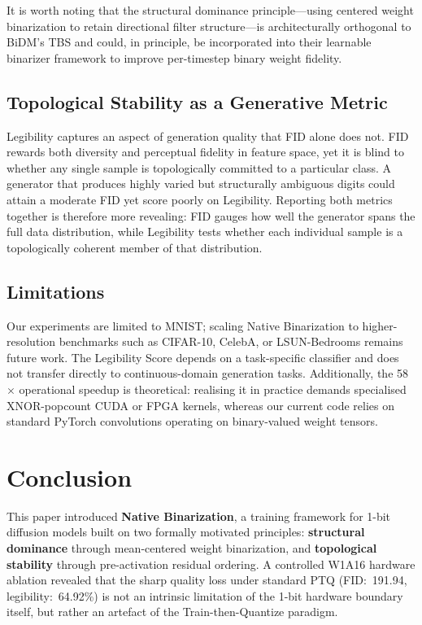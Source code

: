 \documentclass[twocolumn, journal]{IEEEtran}
\begin{document}
It is worth noting that the structural dominance principle---using centered weight
binarization to retain directional filter structure---is architecturally orthogonal to
BiDM's TBS and could, in principle, be incorporated into their learnable binarizer
framework to improve per-timestep binary weight fidelity.

\subsection{Topological Stability as a Generative Metric}

Legibility captures an aspect of generation quality that FID alone does not. FID rewards
both diversity and perceptual fidelity in feature space, yet it is blind to whether any
single sample is topologically committed to a particular class. A generator that produces
highly varied but structurally ambiguous digits could attain a moderate FID yet score
poorly on Legibility. Reporting both metrics together is therefore more revealing: FID
gauges how well the generator spans the full data distribution, while Legibility tests
whether each individual sample is a topologically coherent member of that distribution.

\subsection{Limitations}

Our experiments are limited to MNIST; scaling Native Binarization to higher-resolution
benchmarks such as CIFAR-10, CelebA, or LSUN-Bedrooms remains future work. The
Legibility Score depends on a task-specific classifier and does not transfer directly to
continuous-domain generation tasks. Additionally, the 58$\times$ operational speedup is
theoretical: realising it in practice demands specialised XNOR-popcount CUDA or FPGA
kernels, whereas our current code relies on standard PyTorch convolutions operating on
binary-valued weight tensors.

\section{Conclusion}

This paper introduced \textbf{Native Binarization}, a training framework for 1-bit
diffusion models built on two formally motivated principles: \textbf{structural
dominance} through mean-centered weight binarization, and \textbf{topological stability}
through pre-activation residual ordering. A controlled W1A16 hardware ablation revealed
that the sharp quality loss under standard PTQ (FID:~191.94, legibility:~64.92\%) is not
an intrinsic limitation of the 1-bit hardware boundary itself, but rather an artefact of
the Train-then-Quantize paradigm.
\end{document}
